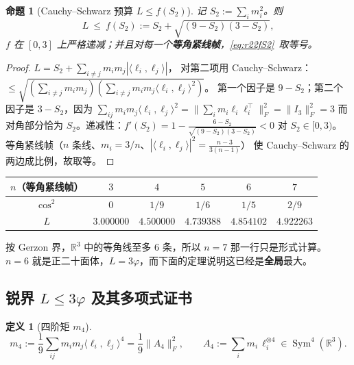 \documentclass[UTF8,11pt]{ctexart}
\newtheorem{proposition}[theorem]{命题}
\theoremstyle{definition}
\newtheorem{definition}[theorem]{定义}
\newcommand{\R}{\mathbb{R}}
\begin{document}
\begin{proposition}[Cauchy--Schwarz 预算 $L\le f(S_2)$]\label{prop:r22fS2}
记 $S_2:=\sum_im_i^2$。则
\begin{equation}\label{eq:r22fS2}
L\ \le\ f(S_2):=S_2+\sqrt{(9-S_2)(3-S_2)},
\end{equation}
$f$ 在 $[0,3]$ 上严格递减；并且对每一个\textbf{等角紧线帧}，\eqref{eq:r22fS2}~取等号。
\end{proposition}

\begin{proof}
$L=S_2+\sum_{i\ne j}m_im_j|\langle\ell_i,\ell_j\rangle|$，
对第二项用 Cauchy--Schwarz：$\le\sqrt{(\sum_{i\ne j}m_im_j)(\sum_{i\ne j}m_im_j\langle\ell_i,\ell_j\rangle^2)}$。
第一个因子是 $9-S_2$；第二个因子是 $3-S_2$，因为
$\sum_{ij}m_im_j\langle\ell_i,\ell_j\rangle^2=\|\sum_im_i\ell_i\ell_i^\top\|_F^2=\|I_3\|_F^2=3$
而对角部分恰为 $S_2$。递减性：$f'(S_2)=1-\frac{6-S_2}{\sqrt{(9-S_2)(3-S_2)}}<0$ 对 $S_2\in[0,3)$。
等角紧线帧（$n$ 条线、$m_i=3/n$、$|\langle\ell_i,\ell_j\rangle|^2=\frac{n-3}{3(n-1)}$）
使 Cauchy--Schwarz 的两边成比例，故取等。
\end{proof}

\begin{center}\small
\begin{tabular}{c|ccccc}
\toprule
$n$（等角紧线帧） & $3$ & $4$ & $5$ & $6$ & $7$\\
\midrule
$\cos^2$ & $0$ & $1/9$ & $1/6$ & $1/5$ & $2/9$\\
$L$ & $3.000000$ & $4.500000$ & $4.739388$ & $4.854102$ & $4.922263$\\
\bottomrule
\end{tabular}
\end{center}
按 Gerzon 界，$\R^3$ 中的等角线至多 $6$ 条，所以 $n=7$ 那一行只是形式计算。
$n=6$ 就是正二十面体，$L=3\varphi$，而下面的定理说明这已经是\textbf{全局}最大。

\subsection{锐界 $L\le3\varphi$ 及其多项式证书}\label{sec:r22:3phi}

\begin{definition}[四阶矩 $m_4$]\label{def:r22m4}
\begin{equation}\label{eq:r22m4}
m_4:=\frac19\sum_{ij}m_im_j\langle\ell_i,\ell_j\rangle^4=\frac19\|A_4\|_F^2,
\qquad A_4:=\sum_im_i\,\ell_i^{\otimes4}\in\operatorname{Sym}^4(\R^3).
\end{equation}
\end{definition}
\end{document}
